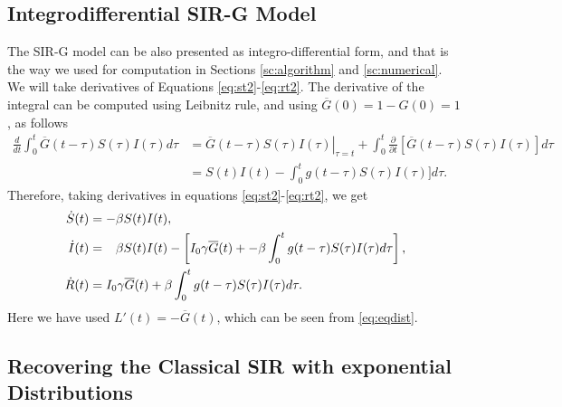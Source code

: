 \documentclass[twoside,USenglish,10pt]{article}
\newcommand{\Gb}{\overline{G}\xspace}
\newcommand{\phm}{\ensuremath\phantom{-}\xspace}
\begin{document}
\subsection{Integrodifferential SIR-G Model}

The SIR-G model can be also presented as integro-differential form, and that is the way we used for computation in Sections \ref{sc:algorithm} and \ref{sc:numerical}. We will take derivatives of Equations \eqref{eq:st2}-\eqref{eq:rt2}. The derivative of the integral can be computed using Leibnitz rule, and using $\Gb(0)=1-G(0)=1$, as follows
\begin{align*}
	\frac{d}{dt}\int_0^t \Gb(t-\tau) S(\tau)I(\tau)d\tau
	&= \left. \Gb(t-\tau) S(\tau)I(\tau) \right|_{\tau=t}
	 + \int_0^t \frac{\partial}{\partial t} [\Gb(t-\tau) S(\tau)I(\tau)]d\tau \\
	&= S(t)I(t) -  \int_0^t g(t-\tau) S(\tau)I(\tau)]d\tau.
\end{align*}
Therefore, taking derivatives in equations \eqref{eq:st2}-\eqref{eq:rt2}, we get
\begin{subequations}
	\begin{align}
		\dot S(t) &= -\beta S(t)I(t), 
		\label{eq:Sdot2} \\
		\dot I(t) &= \phm  \beta  S(t)I(t) - \left[ I_0 \gamma \Gb(t) +  - \beta\int_0^t g(t-\tau) S(\tau)I(\tau)d\tau \right],
		\label{eq:Idot2} \\
		\dot R(t) &= I_0 \gamma \Gb(t) + \beta\int_0^t g(t-\tau) S(\tau)I(\tau)d\tau.
		\label{eq:Rdot2}
	\end{align}
\end{subequations}
Here we have used $L'(t)=-\Gb(t)$, which  can be seen from \eqref{eq:eqdist}.


\subsection{Recovering the Classical SIR with exponential Distributions}
\end{document}
